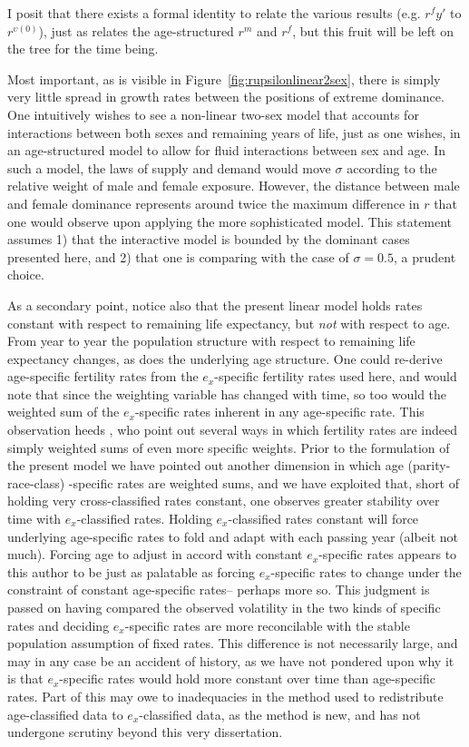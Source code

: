  \FloatBarrier
I posit that there exists a formal identity to relate the various results
(e.g. $r^f{y'}$ to $r^{\upsilon (0)}$), just as \citet[pp. 56]{coale1972growth} relates 
the age-structured $r^m$ and $r^f$, but this fruit will be left on the tree
for the time being.

Most important, as is visible in Figure~\ref{fig:rupsilonlinear2sex}, there is
simply very little spread in growth rates between the positions of extreme
dominance. One intuitively wishes to see a non-linear two-sex model that
accounts for interactions between both sexes and remaining years of life, just
as one wishes, in an age-structured model to allow for fluid interactions
between sex and age. In such a model, the laws of supply and demand would move
$\sigma$ according to the relative weight of male and female exposure. However,
the distance between male and female dominance represents around twice the
maximum difference in $r$ that one would observe upon applying the more
sophisticated model. This statement assumes 1) that the interactive model is
bounded by the dominant cases presented here, and 2) that one is comparing with
the case of $\sigma = 0.5$, a prudent choice. 

As a secondary point, notice also that the present linear model holds rates
constant with respect to remaining life expectancy, but \textit{not} with
respect to age. From year to year the population structure with
respect to remaining life expectancy changes, as does the underlying age
structure. One could re-derive age-specific fertility rates from the
$e_x$-specific fertility rates used here, and would note that since the
weighting variable has changed with time, so too would the weighted sum of
the $e_x$-specific rates inherent in any age-specific rate. This observation
heeds \citet{stolnitz1949recent}, who point out several ways in which
fertility rates are indeed simply weighted sums of even more specific weights.
Prior to the formulation of the present model we have pointed out another
dimension in which age (parity-race-class) -specific rates are weighted sums, and we have exploited
that, short of holding very cross-classified rates constant, one observes
greater stability over time with $e_x$-classified rates. Holding
$e_x$-classified rates constant will force underlying age-specific rates to fold
and adapt with each passing year (albeit not much). Forcing age to adjust in
accord with constant $e_x$-specific rates appears to this author to be just as
palatable as forcing $e_x$-specific rates to change under the constraint of
constant age-specific rates-- perhaps more so. This judgment is passed on having
compared the observed volatility in the two kinds of specific rates and deciding
$e_x$-specific rates are more reconcilable with the stable population
assumption of fixed rates. This difference is not necessarily large, and may in
any case be an accident of history, as we have not pondered upon why it is that
$e_x$-specific rates would hold more constant over time than age-specific rates.
Part of this may owe to inadequacies in the method used to redistribute
age-classified data to $e_x$-classified data, as the method is new, and has not
undergone scrutiny beyond this very dissertation.